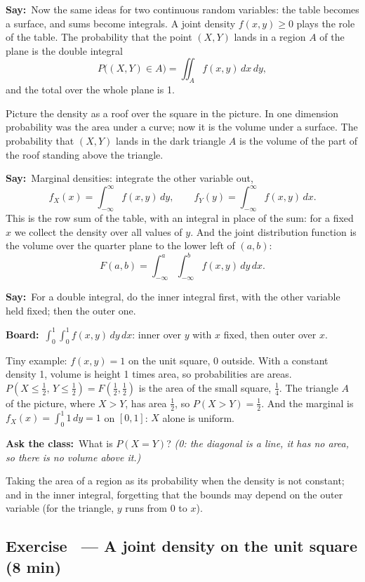 \documentclass[11pt,a4paper,parskip=half]{scrartcl}
\renewcommand{\needspace}[1]{\Needspace{6\baselineskip}}
\newcommand{\say}{\textbf{\color{teal}Say:}\ }
\newcommand{\board}{\textbf{\color{gold}Board:}\ }
\newcommand{\ask}{\textbf{\color{navy}Ask the class:}\ }
\begin{document}
\say Now the same ideas for two continuous random variables: the table
becomes a surface, and sums become integrals. A joint density
$f(x,y)\ge0$ plays the role of the table. The probability that the point
$(X,Y)$ lands in a region $A$ of the plane is the double integral
\[ P\big((X,Y)\in A\big)=\iint_A f(x,y)\,dx\,dy, \]
and the total over the whole plane is 1.

Picture the density as a roof over the square in the picture. In one
dimension probability was the area under a curve; now it is the volume
under a surface. The probability that $(X,Y)$ lands in the dark triangle
$A$ is the volume of the part of the roof standing above the triangle.

\say Marginal densities: integrate the other variable out,
\[ f_X(x)=\int_{-\infty}^{\infty}f(x,y)\,dy,\qquad
	f_Y(y)=\int_{-\infty}^{\infty}f(x,y)\,dx. \]
This is the row sum of the table, with an integral in place of the sum:
for a fixed $x$ we collect the density over all values of $y$. And the
joint distribution function is the volume over the quarter plane to the
lower left of $(a,b)$:
\[ F(a,b)=\int_{-\infty}^{a}\int_{-\infty}^{b}f(x,y)\,dy\,dx. \]

\say For a double integral, do the inner integral first, with the other
variable held fixed; then the outer one.

\board $\displaystyle\int_0^1\!\!\int_0^1 f(x,y)\,dy\,dx$: inner over $y$
with $x$ fixed, then outer over $x$.

Tiny example: $f(x,y)=1$ on the unit square, 0 outside. With a constant
density 1, volume is height 1 times area, so probabilities are areas.
$P(X\le\tfrac12,\,Y\le\tfrac12)=F(\tfrac12,\tfrac12)$ is the area of the
small square, $\tfrac14$. The triangle $A$ of the picture, where $X>Y$,
has area $\tfrac12$, so $P(X>Y)=\tfrac12$. And the marginal is
$f_X(x)=\int_0^1 1\,dy=1$ on $[0,1]$: $X$ alone is uniform.

\ask What is $P(X=Y)$? \emph{(0: the diagonal is a line, it has no area,
so there is no volume above it.)}

\begin{mistake}
	Taking the area of a region as its probability when the density is not
	constant; and in the inner integral, forgetting that the bounds may
	depend on the outer variable (for the triangle, $y$ runs from 0 to $x$).
\end{mistake}

\needspace{0.25\textheight}
\subsection{Exercise~ --- A joint density on the unit square (8 min)}
\end{document}

